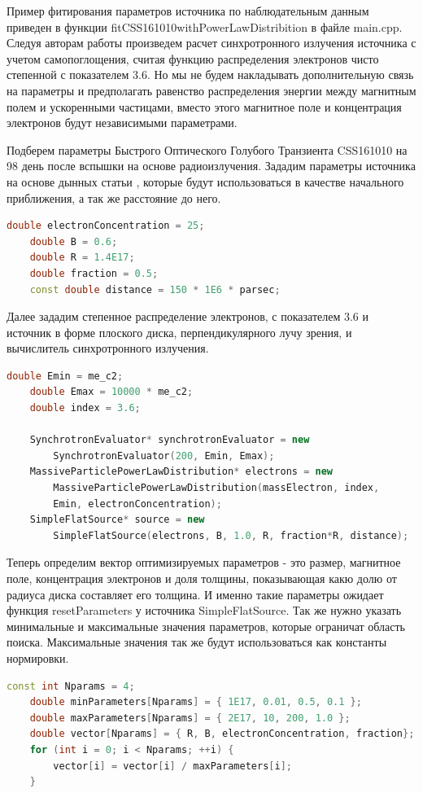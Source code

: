 Пример фитирования параметров источника по наблюдательным данным приведен в функции fitCSS161010withPowerLawDistribition в файле main.cpp. Следуя авторам работы \cite{Coppejans2020} произведем расчет синхротронного излучения источника с учетом самопоглощения, считая функцию распределения электронов чисто степенной с показателем 3.6. Но мы не будем накладывать дополнительную связь на параметры и предполагать равенство распределения энергии между магнитным полем и ускоренными частицами, вместо этого магнитное поле и концентрация электронов будут независимыми параметрами.

Подберем параметры Быстрого Оптического Голубого Транзиента CSS161010 на 98 день после вспышки на основе радиоизлучения. Зададим параметры источника на основе дынных статьи \cite{Coppejans2020}, которые будут использоваться в качестве начального приближения, а так же расстояние до него.
\begin{lstlisting}[language=c++]
    double electronConcentration = 25;
    double B = 0.6;
    double R = 1.4E17;
    double fraction = 0.5;
    const double distance = 150 * 1E6 * parsec;
\end{lstlisting}
Далее зададим степенное распределение электронов, с показателем 3.6 и источник в форме плоского диска, перпендикулярного лучу зрения, и вычислитель синхротронного излучения.
\begin{lstlisting}[language=c++]
    double Emin = me_c2;
    double Emax = 10000 * me_c2;
    double index = 3.6;
	
    SynchrotronEvaluator* synchrotronEvaluator = new 
	    SynchrotronEvaluator(200, Emin, Emax);
    MassiveParticlePowerLawDistribution* electrons = new 
	    MassiveParticlePowerLawDistribution(massElectron, index, 
	    Emin, electronConcentration);
    SimpleFlatSource* source = new 
	    SimpleFlatSource(electrons, B, 1.0, R, fraction*R, distance);
\end{lstlisting}
Теперь определим вектор оптимизируемых параметров - это размер, магнитное поле, концентрация электронов и доля толщины, показывающая какю долю от радиуса диска составляет его толщина. И именно такие параметры ожидает функция resetParameters у источника SimpleFlatSource. Так же нужно указать минимальные и максимальные значения параметров, которые ограничат область поиска. Максимальные значения так же будут использоваться как константы нормировки.
\begin{lstlisting}[language=c++]
    const int Nparams = 4;
    double minParameters[Nparams] = { 1E17, 0.01, 0.5, 0.1 };
    double maxParameters[Nparams] = { 2E17, 10, 200, 1.0 };
    double vector[Nparams] = { R, B, electronConcentration, fraction};
    for (int i = 0; i < Nparams; ++i) {
	    vector[i] = vector[i] / maxParameters[i];
    }
\end{lstlisting}
